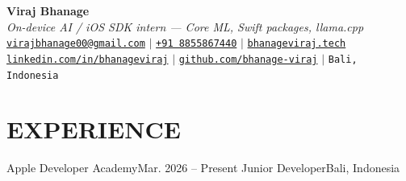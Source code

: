 


\begin{center}
    \textbf{\Huge Viraj Bhanage} \\ \vspace{4pt}
    {\small\textit{On-device AI / iOS SDK intern --- Core ML, Swift packages, llama.cpp}} \\ \vspace{4pt}
    \small
    \faEnvelope \hspace{2pt} \href{mailto:virajbhanage00@gmail.com}{\texttt{virajbhanage00@gmail.com}} \hspace{1pt} $|$
    \hspace{1pt} \faPhone \hspace{2pt} \href{tel:+918855867440}{\texttt{+91 8855867440}} \hspace{1pt} $|$
    \hspace{1pt} \href{https://www.bhanageviraj.tech}{\texttt{bhanageviraj.tech}} \\
    \faLinkedin \hspace{2pt} \href{https://www.linkedin.com/in/bhanageviraj/}{\texttt{linkedin.com/in/bhanageviraj}} \hspace{1pt} $|$
    \hspace{1pt} \faGithub \hspace{2pt} \href{https://github.com/bhanage-viraj}{\texttt{github.com/bhanage-viraj}} \hspace{1pt} $|$
    \hspace{1pt} \faMapMarker* \hspace{2pt}\texttt{Bali, Indonesia}
\end{center}

\section{EXPERIENCE}
  \resumeSubHeadingListStart
    \resumeSubheading
      {Apple Developer Academy}{Mar. 2026 -- Present}
      {Junior Developer}{Bali, Indonesia}
      \resumeItemListStart
      \resumeItemListEnd
  \resumeSubHeadingListEnd


